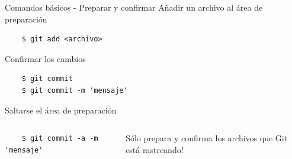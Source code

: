 \begin{frame}[fragile]{Comandos básicos - Preparar y confirmar}
  \alert{Añadir un archivo al área de preparación}
  \begin{verbatim}
    $ git add <archivo>
  \end{verbatim}

  \alert{Confirmar los cambios}
  \begin{verbatim}
    $ git commit
    $ git commit -m 'mensaje'
  \end{verbatim}

  \alert{Saltarse el área de preparación}
  \begin{columns}[onlytextwidth]
  \begin{verbatim}
    $ git commit -a -m 'mensaje'
  \end{verbatim}
    Sólo prepara y confirma los archivos que Git está rastreando!
  \end{columns}

\end{frame}

